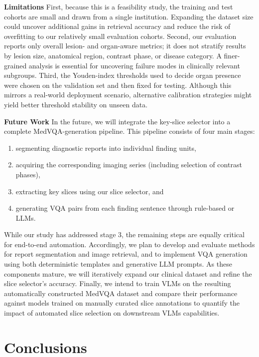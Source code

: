 \documentclass[bioengineering,article,submit,pdftex,moreauthors]{Definitions/mdpi}
\begin{document}
\textbf{Limitations}
First, because this is a feasibility study, the training and test cohorts are small and drawn from a single institution. Expanding the dataset size could uncover additional gains in retrieval accuracy and reduce the risk of overﬁtting to our relatively small evaluation cohorts. 
Second, our evaluation reports only overall lesion- and organ-aware metrics; it does not stratify results by lesion size, anatomical region, contrast phase, or disease category. A finer-grained analysis is essential for uncovering failure modes in clinically relevant subgroups. 
Third, the Youden-index thresholds used to decide organ presence were chosen on the validation set and then fixed for testing. Although this mirrors a real-world deployment scenario, alternative calibration strategies might yield better threshold stability on unseen data. 


\textbf{Future Work}
In the future, we will integrate the key-slice selector into a complete MedVQA-generation pipeline. 
This pipeline consists of four main stages: 
\begin{enumerate}
  \item segmenting diagnostic reports into individual finding units, 
  \item acquiring the corresponding imaging series (including selection of contrast phases),
  \item extracting key slices using our slice selector, and 
  \item generating VQA pairs from each finding sentence through rule-based or LLMs.
\end{enumerate}
While our study has addressed stage 3, 
the remaining steps are equally critical for end-to-end automation.
Accordingly, we plan to develop and evaluate methods for report segmentation and image retrieval, 
and to implement VQA generation using both deterministic templates and generative LLM prompts. 
As these components mature, we will iteratively expand our clinical dataset and refine the slice selector’s accuracy. 
Finally, we intend to train VLMs on the resulting automatically constructed MedVQA dataset and compare their performance against 
models trained on manually curated slice annotations to quantify the impact of automated slice selection on downstream VLMs capabilities.


\section{Conclusions}
\end{document}
